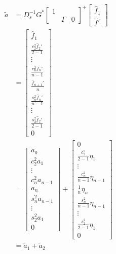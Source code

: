 \begin{align}
    \tilde{a} &= D_{s}^{-1}G^{*}
        \begin{bmatrix} 1 &  & \\ & \Gamma & 0 \end{bmatrix}^{+}
        \begin{bmatrix} \hat{f}_{1} \\ \hat{f}' \end{bmatrix} \nonumber\\
    &= \begin{bmatrix} \hat{f}_{1} \\ \frac{c_{2}^{2}\hat{f}_{2}'}{2-1} \\
        \vdots \\ \frac{c_{n}^{2}\hat{f}_{n}'}{n-1} \\
        \frac{\hat{f}_{n+1}'}{n} \\ \frac{s_{n}^{2}\hat{f}_{n}'}{n-1} \\
        \vdots \\ \frac{s_{2}^{2}\hat{f}_{2}'}{2-1} \\ 0 \end{bmatrix}
        \nonumber\\
    &= \begin{bmatrix} a_{0} \\
        c_{2}^{2}a_{1} \\ \vdots \\
        c_{n}^{2}a_{n-1}  \\
        a_{n} \\
        s_{n}^{2}a_{n-1} \\ \vdots \\
        s_{2}^{2}a_{1} \\ 0 \end{bmatrix}
    + \begin{bmatrix} 0 \\
        \frac{c_{2}^{2}}{2-1}\eta_{1} \\ \vdots \\
        \frac{c_{n}^{2}}{n-1}\eta_{n-1} \\
        \frac{1}{n}\eta_{n} \\
        \frac{s_{n}^{2}}{n-1}\eta_{n-1} \\ \vdots \\
        \frac{s_{2}^{2}}{2-1}\eta_{1} \\ 0
    \end{bmatrix}
        \nonumber\\
    &= \tilde{a}_{1} + \tilde{a}_{2}
\end{align}
